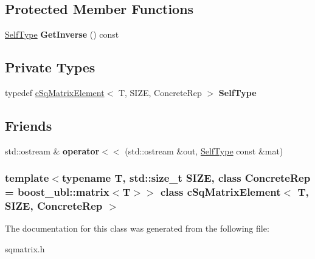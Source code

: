 \subsection*{\-Protected \-Member \-Functions}
\begin{DoxyCompactItemize}
\item 
\hypertarget{classcSqMatrixElement_abb0ae8affc45bdf255e8cc11e0beb5d2}{
\hyperlink{classcSqMatrixElement}{\-Self\-Type} {\bfseries \-Get\-Inverse} () const }
\label{classcSqMatrixElement_abb0ae8affc45bdf255e8cc11e0beb5d2}

\end{DoxyCompactItemize}
\subsection*{\-Private \-Types}
\begin{DoxyCompactItemize}
\item 
\hypertarget{classcSqMatrixElement_a00de9a0b673c4b8981af9046bef4dcf0}{
typedef \hyperlink{classcSqMatrixElement}{c\-Sq\-Matrix\-Element}$<$ \-T, \*
\-S\-I\-Z\-E, \-Concrete\-Rep $>$ {\bfseries \-Self\-Type}}
\label{classcSqMatrixElement_a00de9a0b673c4b8981af9046bef4dcf0}

\end{DoxyCompactItemize}
\subsection*{\-Friends}
\begin{DoxyCompactItemize}
\item 
\hypertarget{classcSqMatrixElement_afad53b95d982a8dccd99c667c7ebd98d}{
std\-::ostream \& {\bfseries operator$<$$<$} (std\-::ostream \&out, \hyperlink{classcSqMatrixElement}{\-Self\-Type} const \&mat)}
\label{classcSqMatrixElement_afad53b95d982a8dccd99c667c7ebd98d}

\end{DoxyCompactItemize}
\subsubsection*{template$<$typename T, std\-::size\-\_\-t \-S\-I\-Z\-E, class Concrete\-Rep = boost\-\_\-ubl\-::matrix$<$\-T$>$$>$ class c\-Sq\-Matrix\-Element$<$ T, S\-I\-Z\-E, Concrete\-Rep $>$}



\-The documentation for this class was generated from the following file\-:\begin{DoxyCompactItemize}
\item 
sqmatrix.\-h\end{DoxyCompactItemize}
